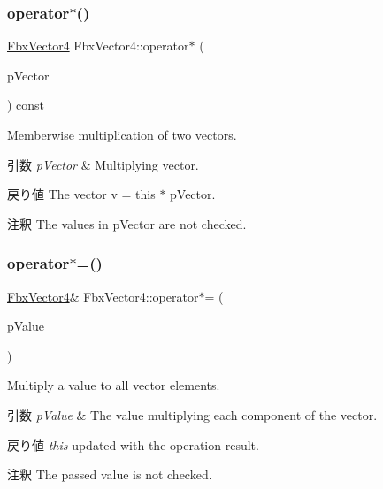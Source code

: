 \subsubsection{\texorpdfstring{operator$\ast$()}{operator*()}\hspace{0.1cm}{\footnotesize\ttfamily [2/2]}}
{\footnotesize\ttfamily \hyperlink{class_fbx_vector4}{Fbx\+Vector4} Fbx\+Vector4\+::operator$\ast$ (\begin{DoxyParamCaption}\item[{const \hyperlink{class_fbx_vector4}{Fbx\+Vector4} \&}]{p\+Vector }\end{DoxyParamCaption}) const}

Memberwise multiplication of two vectors. 
\begin{DoxyParams}{引数}
{\em p\+Vector} & Multiplying vector. \\
\hline
\end{DoxyParams}
\begin{DoxyReturn}{戻り値}
The vector v\textquotesingle{} = this $\ast$ p\+Vector. 
\end{DoxyReturn}
\begin{DoxyRemark}{注釈}
The values in p\+Vector are not checked. 
\end{DoxyRemark}
\mbox{\label{class_fbx_vector4_ab5d9688dc2682376c623db6d4b0edcd9}} 
\subsubsection{\texorpdfstring{operator$\ast$=()}{operator*=()}\hspace{0.1cm}{\footnotesize\ttfamily [1/2]}}
{\footnotesize\ttfamily \hyperlink{class_fbx_vector4}{Fbx\+Vector4}\& Fbx\+Vector4\+::operator$\ast$= (\begin{DoxyParamCaption}\item[{double}]{p\+Value }\end{DoxyParamCaption})}

Multiply a value to all vector elements. 
\begin{DoxyParams}{引数}
{\em p\+Value} & The value multiplying each component of the vector. \\
\hline
\end{DoxyParams}
\begin{DoxyReturn}{戻り値}
{\itshape this} updated with the operation result. 
\end{DoxyReturn}
\begin{DoxyRemark}{注釈}
The passed value is not checked. 
\end{DoxyRemark}
\mbox{\label{class_fbx_vector4_a77aeb266383501325fb91538ca17ff4c}} 
